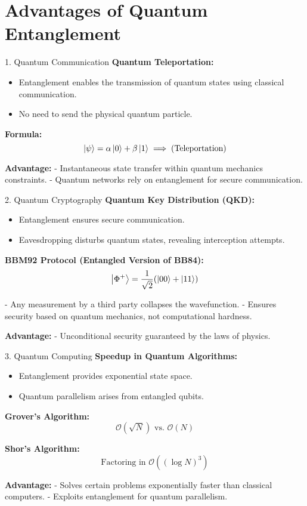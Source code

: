 \documentclass{beamer}
\begin{document}
\section{Advantages of Quantum Entanglement}
\begin{frame}{1. Quantum Communication}
\textbf{Quantum Teleportation:}
\begin{itemize}
    \item Entanglement enables the transmission of quantum states using classical communication.
    \item No need to send the physical quantum particle.
\end{itemize}

\pause
\textbf{Formula:}
\[
\ket{\psi} = \alpha \ket{0} + \beta \ket{1} \implies \text{(Teleportation)}
\]

\textbf{Advantage:}
- Instantaneous state transfer within quantum mechanics constraints.
- Quantum networks rely on entanglement for secure communication.
\end{frame}

\begin{frame}{2. Quantum Cryptography}
\textbf{Quantum Key Distribution (QKD):}
\begin{itemize}
    \item Entanglement ensures secure communication.
    \item Eavesdropping disturbs quantum states, revealing interception attempts.
\end{itemize}

\textbf{BBM92 Protocol (Entangled Version of BB84):}
\[
\ket{\Phi^+} = \frac{1}{\sqrt{2}}(\ket{00} + \ket{11})
\]

- Any measurement by a third party collapses the wavefunction.  
- Ensures security based on quantum mechanics, not computational hardness.

\pause
\textbf{Advantage:}
- Unconditional security guaranteed by the laws of physics.
\end{frame}

\begin{frame}{3. Quantum Computing}
\textbf{Speedup in Quantum Algorithms:}
\begin{itemize}
    \item Entanglement provides exponential state space.
    \item Quantum parallelism arises from entangled qubits.
\end{itemize}

\textbf{Grover's Algorithm:}
\[
\mathcal{O}(\sqrt{N}) \text{ vs. } \mathcal{O}(N)
\]

\textbf{Shor's Algorithm:}
\[
\text{Factoring in } \mathcal{O}((\log N)^3)
\]

\pause
\textbf{Advantage:}
- Solves certain problems exponentially faster than classical computers.
- Exploits entanglement for quantum parallelism. 
\end{frame}
\end{document}

